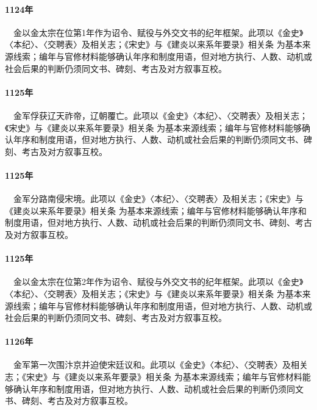 \paragraph{1124年}　金以金太宗在位第1年作为诏令、赋役与外交文书的纪年框架。此项以《金史》〈本纪〉、〈交聘表〉及相关志；《宋史》与《建炎以来系年要录》相关条 为基本来源线索；编年与官修材料能够确认年序和制度用语，但对地方执行、人数、动机或社会后果的判断仍须同文书、碑刻、考古及对方叙事互校。

\paragraph{1125年}　金军俘获辽天祚帝，辽朝覆亡。此项以《金史》〈本纪〉、〈交聘表〉及相关志；《宋史》与《建炎以来系年要录》相关条 为基本来源线索；编年与官修材料能够确认年序和制度用语，但对地方执行、人数、动机或社会后果的判断仍须同文书、碑刻、考古及对方叙事互校。

\paragraph{1125年}　金军分路南侵宋境。此项以《金史》〈本纪〉、〈交聘表〉及相关志；《宋史》与《建炎以来系年要录》相关条 为基本来源线索；编年与官修材料能够确认年序和制度用语，但对地方执行、人数、动机或社会后果的判断仍须同文书、碑刻、考古及对方叙事互校。

\paragraph{1125年}　金以金太宗在位第2年作为诏令、赋役与外交文书的纪年框架。此项以《金史》〈本纪〉、〈交聘表〉及相关志；《宋史》与《建炎以来系年要录》相关条 为基本来源线索；编年与官修材料能够确认年序和制度用语，但对地方执行、人数、动机或社会后果的判断仍须同文书、碑刻、考古及对方叙事互校。

\paragraph{1126年}　金军第一次围汴京并迫使宋廷议和。此项以《金史》〈本纪〉、〈交聘表〉及相关志；《宋史》与《建炎以来系年要录》相关条 为基本来源线索；编年与官修材料能够确认年序和制度用语，但对地方执行、人数、动机或社会后果的判断仍须同文书、碑刻、考古及对方叙事互校。

